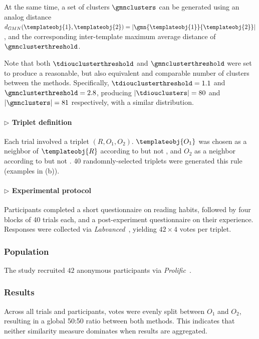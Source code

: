 At the same time, a set of clusters $\gmnclusters$ can be generated using an analog distance $d_{GMN}(\templateobj{1},\templateobj{2}) = |\gmn{\templateobj{1}}{\templateobj{2}}|$, and the corresponding inter-template maximum average distance of $\gmnclusterthreshold$.

Note that both $\tdiouclusterthreshold$ and $\gmnclusterthreshold$ were set to produce a reasonable, but also equivalent and comparable number of clusters between the methods. Specifically, $\tdiouclusterthreshold = 1.1$ and $\gmnclusterthreshold=2.8$, producing $|\tdiouclusters| = 80$ and $|\gmnclusters| = 81$ respectively, with a similar distribution.

\paragraph{$\triangleright$ Triplet definition}
Each trial involved a triplet $(R,O_1,O_2)$. $\templateobj{O_1}$ was chosen as a neighbor of $\templateobj{R}$ according to  but not , and $O_2$ as a neighbor according to  but not .  40 randomnly-selected triplets were generated this rule (examples in (b)).

\paragraph{$\triangleright$ Experimental protocol}
Participants completed a short questionnaire on reading habits, followed by four blocks of 40 trials each, and a post-experiment questionnaire on their experience. Responses were collected via \emph{Labvanced}~\cite{labvanced}, yielding $42 \times 4$ votes per triplet.

\subsubsection{Population}

The study recruited $42$ anonymous participants via \emph{Prolific}~\cite{prolific}.

\subsubsection{Results}
Across all trials and participants, votes were evenly split between $O_1$ and $O_2$, resulting in a global 50:50 ratio between both methods. This indicates that neither similarity measure dominates when results are aggregated.

